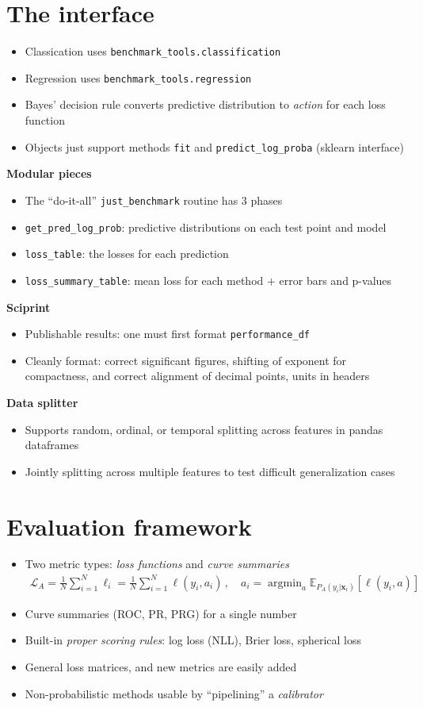 \documentclass[a0,landscape]{a0poster}
\newcommand{\mysection}[1]{\section*{\fontsize{67.1}{82} \selectfont \color{NavyBlue} #1 \color{Black}}}
\renewcommand{\vec}[1]{{\boldsymbol{\mathbf{#1}}}} %
\newcommand{\E}{\mathbb{E}}
\newcommand{\Loss}{\mathcal{L}}
\newcommand{\loss}{\ell}
\DeclareMathOperator*{\argmin}{argmin}
\newcommand{\code}{\texttt}
\newcommand{\sectionx}{\textbf}
\begin{document}
\begin{multicols}{3}
\mysection{The interface}
%
\begin{itemize}
  \item Classication uses \code{benchmark\_tools.classification}
  \item Regression uses \code{benchmark\_tools.regression}
  \item Bayes' decision rule converts predictive distribution to \emph{action} for each loss function
  \item Objects just support methods \code{fit} and \code{predict\_log\_proba} (sklearn interface)
\end{itemize}
%
\sectionx{Modular pieces}
\begin{itemize}
  \item The ``do-it-all'' \code{just\_benchmark} routine has 3 phases
  \item \code{get\_pred\_log\_prob}: predictive distributions on each test point and model
  \item \code{loss\_table}: the losses for each prediction
  \item \code{loss\_summary\_table}: mean loss for each method $+$ error bars and p-values
\end{itemize}
%
\sectionx{Sciprint}
\begin{itemize}
  \item Publishable results: one must first format \code{performance\_df}
  \item Cleanly format: correct significant figures, shifting of exponent for compactness, and correct alignment of decimal points, units in headers
\end{itemize}
%
\sectionx{Data splitter}
\begin{itemize}
  \item Supports random, ordinal, or temporal splitting across features in pandas dataframes
  \item Jointly splitting across multiple features to test difficult generalization cases
\end{itemize}

\columnbreak

\mysection{Evaluation framework}

\begin{itemize}
  \item Two metric types: \emph{loss functions} and \emph{curve summaries}
  \begin{align}
    \Loss_A = \frac{1}{N} \sum_{i=1}^N \loss_i = \frac{1}{N} \sum_{i=1}^N \loss(y_i, a_i)\,, \quad a_i = \argmin_a \E_{P_A(y_i|\vec x_i)}[\loss(y_i, a)]
  \end{align}
  \item Curve summaries (ROC, PR, PRG) for a single number
  \item Built-in \emph{proper scoring rules}: log loss (NLL), Brier loss, spherical loss
  \item General loss matrices, and new metrics are easily added
  \item Non-probabilistic methods usable by ``pipelining'' a \emph{calibrator}
\end{itemize}


\end{multicols}
\end{document}
